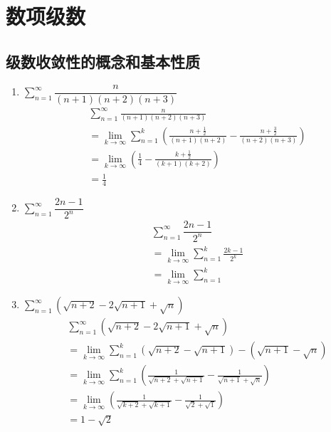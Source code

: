 \chapter{数项级数}
\section{级数收敛性的概念和基本性质}

\begin{enumerate}
    \item \(\sum\limits_{n=1}^{\infty}
        \dfrac{n}{(n+1)(n+2)(n+3)}\)
        \begin{align*}
            & \sum\limits_{n=1}^{\infty} \frac{n}{(n+1)(n+2)(n+3)} \\
            & = \lim_{k \to \infty} \sum\limits_{n=1}^{k}
            \left(\frac{n+\tfrac{1}{2}}{(n+1)(n+2)} -
            \frac{n+\tfrac{3}{2}}{(n+2)(n+3)}\right)                \\
            & = \lim_{k \to \infty} \left( \frac{1}{4} - \frac{k +
            \tfrac{1}{2}}{(k+1)(k+2)} \right)                       \\
            & = \frac{1}{4}
        \end{align*}
    \item \(\sum\limits_{n=1}^{\infty} \dfrac{2n-1}{2^{n}}\)
        \begin{align*}
            & \sum\limits_{n=1}^{\infty} \dfrac{2n-1}{2^{n}}          \\
            & = \lim_{k \to \infty} \sum_{n=1}^{k} \frac{2k-1}{2^{k}} \\
            & = \lim_{k \to \infty} \sum_{n=1}^{k}
        \end{align*}
    \item \(\sum\limits_{n=1}^{\infty} \left(
        \sqrt{n+2}-2\sqrt{n+1}+\sqrt{n} \right) \)
        \begin{align*}
            & \sum\limits_{n=1}^{\infty} \left(
            \sqrt{n+2}-2\sqrt{n+1}+\sqrt{n} \right)                          \\
            & = \lim_{k \to \infty} \sum_{n=1}^{k} \left(
            \sqrt{n+2}-\sqrt{n+1}\right) - \left(\sqrt{n+1}-\sqrt{n} \right) \\
            & = \lim_{k \to \infty}  \sum_{n=1}^{k} \left(
                \frac{1}{\sqrt{n+2}+\sqrt{n+1}} -
            \frac{1}{\sqrt{n+1}+\sqrt{n}} \right)                            \\
            & = \lim_{k \to \infty} \left(
                \frac{1}{\sqrt{k+2}+\sqrt{k+1}} -
            \frac{1}{\sqrt{2}+\sqrt{1}} \right)                              \\
            & = 1 - \sqrt{2}
        \end{align*}

\end{enumerate}

